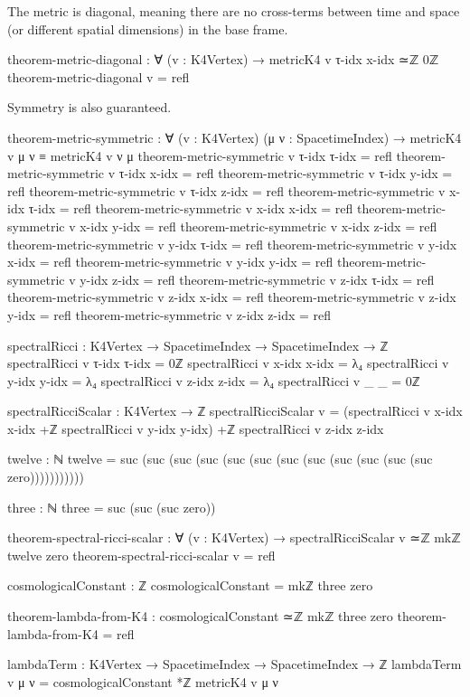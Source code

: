 \documentclass[11pt,a4paper]{book}
\begin{document}
The metric is diagonal, meaning there are no cross-terms between time and space (or different spatial dimensions) in the base frame.

\begin{code}
theorem-metric-diagonal : ∀ (v : K4Vertex) → metricK4 v τ-idx x-idx ≃ℤ 0ℤ
theorem-metric-diagonal v = refl
\end{code}

Symmetry is also guaranteed.

\begin{code}
theorem-metric-symmetric : ∀ (v : K4Vertex) (μ ν : SpacetimeIndex) → 
                           metricK4 v μ ν ≡ metricK4 v ν μ
theorem-metric-symmetric v τ-idx τ-idx = refl
theorem-metric-symmetric v τ-idx x-idx = refl
theorem-metric-symmetric v τ-idx y-idx = refl
theorem-metric-symmetric v τ-idx z-idx = refl
theorem-metric-symmetric v x-idx τ-idx = refl
theorem-metric-symmetric v x-idx x-idx = refl
theorem-metric-symmetric v x-idx y-idx = refl
theorem-metric-symmetric v x-idx z-idx = refl
theorem-metric-symmetric v y-idx τ-idx = refl
theorem-metric-symmetric v y-idx x-idx = refl
theorem-metric-symmetric v y-idx y-idx = refl
theorem-metric-symmetric v y-idx z-idx = refl
theorem-metric-symmetric v z-idx τ-idx = refl
theorem-metric-symmetric v z-idx x-idx = refl
theorem-metric-symmetric v z-idx y-idx = refl
theorem-metric-symmetric v z-idx z-idx = refl

spectralRicci : K4Vertex → SpacetimeIndex → SpacetimeIndex → ℤ
spectralRicci v τ-idx τ-idx = 0ℤ
spectralRicci v x-idx x-idx = λ₄
spectralRicci v y-idx y-idx = λ₄
spectralRicci v z-idx z-idx = λ₄
spectralRicci v _     _     = 0ℤ

spectralRicciScalar : K4Vertex → ℤ
spectralRicciScalar v = (spectralRicci v x-idx x-idx +ℤ
                         spectralRicci v y-idx y-idx) +ℤ
                         spectralRicci v z-idx z-idx

twelve : ℕ
twelve = suc (suc (suc (suc (suc (suc (suc (suc (suc (suc (suc (suc zero)))))))))))

three : ℕ
three = suc (suc (suc zero))

theorem-spectral-ricci-scalar : ∀ (v : K4Vertex) → 
  spectralRicciScalar v ≃ℤ mkℤ twelve zero
theorem-spectral-ricci-scalar v = refl

cosmologicalConstant : ℤ
cosmologicalConstant = mkℤ three zero

theorem-lambda-from-K4 : cosmologicalConstant ≃ℤ mkℤ three zero
theorem-lambda-from-K4 = refl

lambdaTerm : K4Vertex → SpacetimeIndex → SpacetimeIndex → ℤ
lambdaTerm v μ ν = cosmologicalConstant *ℤ metricK4 v μ ν
\end{code}
\end{document}
